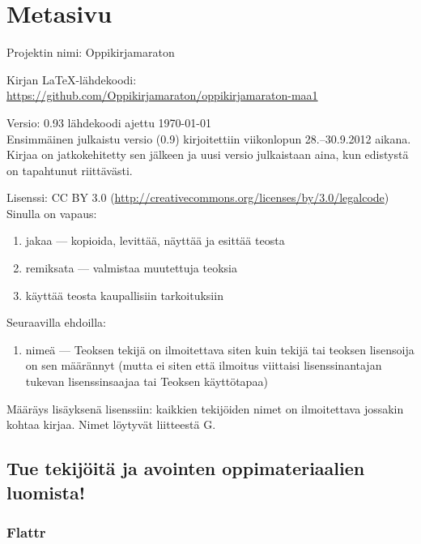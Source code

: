 \newpage

\section*{Metasivu}

Projektin nimi: Oppikirjamaraton

Kirjan LaTeX-lähdekoodi: \\
\url{https://github.com/Oppikirjamaraton/oppikirjamaraton-maa1}

Versio: 0.93 \qquad lähdekoodi ajettu \today \\
Ensimmäinen julkaistu versio (0.9) kirjoitettiin viikonlopun 28.--30.9.2012 aikana. Kirjaa on jatkokehitetty sen jälkeen ja uusi versio julkaistaan aina, kun edistystä on tapahtunut riittävästi.

Lisenssi: CC BY 3.0 (\url{http://creativecommons.org/licenses/by/3.0/legalcode})\\
Sinulla on vapaus:
\begin{enumerate}
\item jakaa — kopioida, levittää, näyttää ja esittää teosta
\item remiksata — valmistaa muutettuja teoksia
\item käyttää teosta kaupallisiin tarkoituksiin
\end{enumerate}
Seuraavilla ehdoilla:
\begin{enumerate}
\item nimeä — Teoksen tekijä on ilmoitettava siten kuin tekijä tai teoksen lisensoija on sen määrännyt (mutta ei siten että ilmoitus viittaisi lisenssinantajan tukevan lisenssinsaajaa tai Teoksen käyttötapaa)
\end{enumerate}

Määräys lisäyksenä lisenssiin: kaikkien tekijöiden nimet on ilmoitettava jossakin kohtaa kirjaa. Nimet löytyvät liitteestä G.

\subsection*{Tue tekijöitä ja avointen oppimateriaalien luomista!}

\subsubsection*{Flattr}

